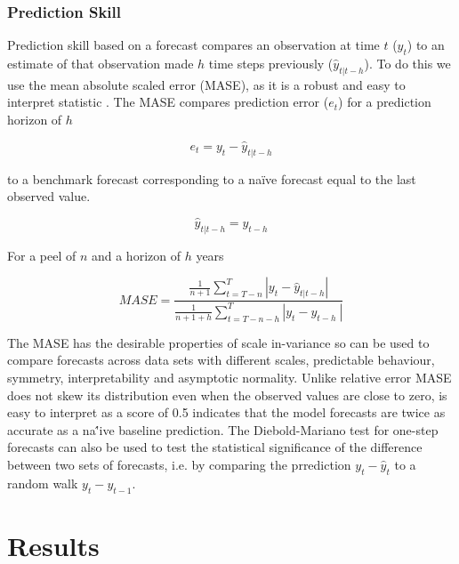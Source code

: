 \documentclass[12pt,halfline,a4paper,nonumbib]{ouparticle}
\begin{document}
\subsubsection{Prediction Skill}

Prediction skill based on a forecast compares an observation at time $t$ ($y_t$) to an estimate of that observation made $h$ time steps previously ($\hat{y}_{t|t-h}$). To do this we use the mean absolute scaled error (MASE), as it is a robust and easy to interpret statistic \parencite{hyndman2006another}. The MASE compares prediction error ($e_t$) for a prediction horizon of $h$ 

\begin{equation}
\label{eqn:err}
 e_t = y_t -\hat{y}_{t|t-h} 
\end{equation}

\noindent 
to a benchmark forecast corresponding to a na\"{i}ve forecast equal to the last observed value. 

\begin{equation} 
\hat{y}_{t|t-h}=y_{t-h}
\end{equation}

\noindent For a peel of $n$ and a horizon of $h$ years

\begin{equation}
\label{eqn:skill}
MASE=\frac{\frac{1}{n+1}\sum_{t=T-n}^{T} \left| y_t - \hat{y}_{t|t-h} \right|}{\frac{1}{n+1+h}\sum_{t=T-n-h}^{T} \left| y_{t} - {y}_{t-h}\ \right|}
\end{equation}

The MASE has the desirable properties of scale in-variance so can be used to compare forecasts across data sets with different scales, predictable behaviour, symmetry, interpretability and asymptotic normality. Unlike relative error MASE does not skew its distribution even when the observed values are close to zero, is easy to interpret as a score of 0.5 indicates that the model forecasts are twice as accurate as a na\''{i}ve baseline prediction. The Diebold-Mariano test \parencite{diebold1995comparing} for one-step forecasts can also be used to test the statistical significance of the difference between two sets of forecasts, i.e. by comparing the prrediction $y_t -\hat{y}_t$ to a random walk $y_t-y_{t-1}$. 

\section{Results}
\end{document}
